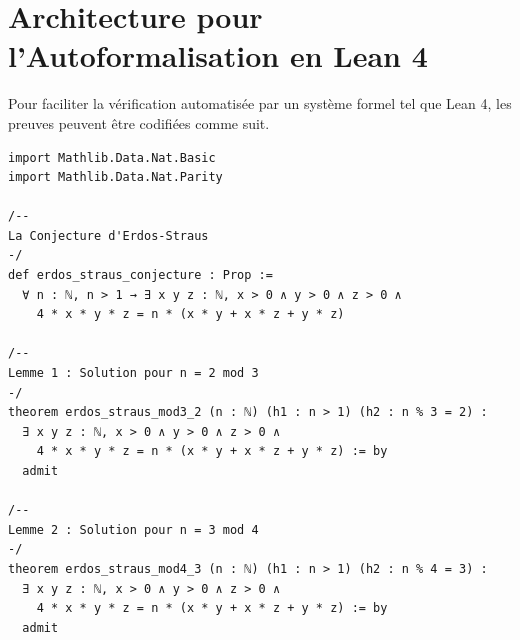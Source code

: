 \documentclass[11pt,a4paper]{article}
\begin{document}
\section{Architecture pour l'Autoformalisation en Lean 4}

Pour faciliter la v\'erification automatis\'ee par un syst\`eme formel tel que Lean 4, les preuves peuvent \^etre codifi\'ees comme suit.

\begin{lstlisting}[basicstyle=\ttfamily\small, breaklines=true]
import Mathlib.Data.Nat.Basic
import Mathlib.Data.Nat.Parity

/--
La Conjecture d'Erdos-Straus
-/
def erdos_straus_conjecture : Prop :=
  ∀ n : ℕ, n > 1 → ∃ x y z : ℕ, x > 0 ∧ y > 0 ∧ z > 0 ∧
    4 * x * y * z = n * (x * y + x * z + y * z)

/--
Lemme 1 : Solution pour n = 2 mod 3
-/
theorem erdos_straus_mod3_2 (n : ℕ) (h1 : n > 1) (h2 : n % 3 = 2) :
  ∃ x y z : ℕ, x > 0 ∧ y > 0 ∧ z > 0 ∧
    4 * x * y * z = n * (x * y + x * z + y * z) := by
  admit

/--
Lemme 2 : Solution pour n = 3 mod 4
-/
theorem erdos_straus_mod4_3 (n : ℕ) (h1 : n > 1) (h2 : n % 4 = 3) :
  ∃ x y z : ℕ, x > 0 ∧ y > 0 ∧ z > 0 ∧
    4 * x * y * z = n * (x * y + x * z + y * z) := by
  admit
\end{lstlisting}
\end{document}
